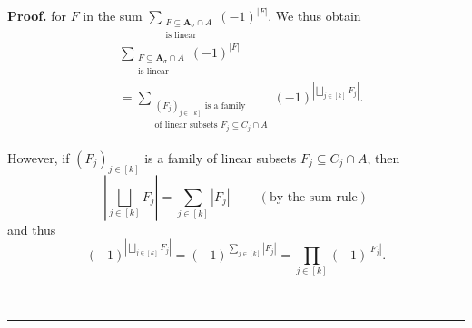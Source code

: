 \documentclass[numbers=enddot,12pt,final,onecolumn,notitlepage]{scrartcl}%
\numberwithin{exer}{section}
\theoremstyle{definition}
\newenvironment{proof}[1][Proof]{\noindent\textbf{#1.} }{\ \rule{0.5em}{0.5em}}
\let\sumnonlimits\sum
\let\prodnonlimits\prod
\let\sqcupnonlimits\bigsqcup
\renewcommand{\sum}{\sumnonlimits\limits}
\renewcommand{\prod}{\prodnonlimits\limits}
\renewcommand{\bigsqcup}{\sqcupnonlimits\limits}
\newenvironment{verlong}{}{}
\begin{document}
\begin{verlong}
\begin{proof}
for $F$ in the sum $\sum_{\substack{F\subseteq\mathbf{A}_{\sigma}\cap
A\\\text{is linear}}}\left(  -1\right)  ^{\left\vert F\right\vert }$. We thus
obtain%
\begin{align}
&  \sum_{\substack{F\subseteq\mathbf{A}_{\sigma}\cap A\\\text{is linear}%
}}\left(  -1\right)  ^{\left\vert F\right\vert }\nonumber\\
&  =\sum_{\substack{\left(  F_{j}\right)  _{j\in\left[  k\right]  }\text{ is a
family}\\\text{of linear subsets }F_{j}\subseteq C_{j}\cap A}}\left(
-1\right)  ^{\left\vert \bigsqcup_{j\in\left[  k\right]  }F_{j}\right\vert }.
\label{pf.prop.linear-in-AsigA.long.1}%
\end{align}


However, if $\left(  F_{j}\right)  _{j\in\left[  k\right]  }$ is a family of
linear subsets $F_{j}\subseteq C_{j}\cap A$, then%
\[
\left\vert \bigsqcup_{j\in\left[  k\right]  }F_{j}\right\vert =\sum
_{j\in\left[  k\right]  }\left\vert F_{j}\right\vert
\ \ \ \ \ \ \ \ \ \ \left(  \text{by the sum rule}\right)
\]
and thus%
\begin{equation}
\left(  -1\right)  ^{\left\vert \bigsqcup_{j\in\left[  k\right]  }%
F_{j}\right\vert }=\left(  -1\right)  ^{\sum_{j\in\left[  k\right]
}\left\vert F_{j}\right\vert }=\prod_{j\in\left[  k\right]  }\left(
-1\right)  ^{\left\vert F_{j}\right\vert }.
\label{pf.prop.linear-in-AsigA.long.2}%
\end{equation}



\end{proof}
\end{verlong}
\end{document}
